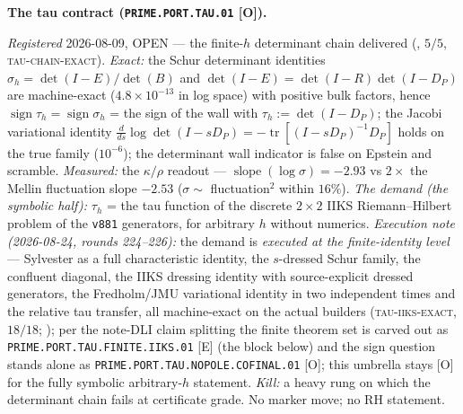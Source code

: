 \par\smallskip\noindent\textbf{The tau contract
(\texttt{PRIME.PORT.\allowbreak TAU.01} [O]).}
{\sloppy
\emph{Registered} 2026-08-09, OPEN --- the finite-$h$
determinant chain delivered
(, $5/5$,
\textsc{tau-chain-exact}).  \emph{Exact:} the Schur determinant
identities $\sigma_h = \det(I - E)/\det(B)$ and $\det(I - E) =
\det(I - R)\det(I - D_P)$ are machine-exact
($4.8\times10^{-13}$ in log space) with positive bulk factors,
hence $\operatorname{sign}\tau_h = \operatorname{sign}\sigma_h$
= the sign of the wall with $\tau_h := \det(I - D_P)$; the
Jacobi variational identity $\frac{d}{ds}\log\det(I - sD_P) =
-\operatorname{tr}[(I - sD_P)^{-1}D_P]$ holds on the true family
($10^{-6}$); the determinant wall indicator is false on Epstein
and scramble.  \emph{Measured:} the $\kappa/\rho$ readout ---
$\operatorname{slope}(\log\sigma) = -2.93$ vs $2\times$ the
Mellin fluctuation slope $-2.53$ ($\sigma \sim$ fluctuation$^2$
within $16\%$).  \emph{The demand (the symbolic half):} $\tau_h$
= the tau function of the discrete $2\times2$ IIKS
Riemann--Hilbert problem of the \texttt{v881} generators, for
arbitrary $h$ without numerics.  \emph{Execution note
(2026-08-24, rounds 224--226):} the demand is \emph{executed at
the finite-identity level} --- Sylvester as a full
characteristic identity, the $s$-dressed Schur family, the
confluent diagonal, the IIKS dressing identity with
source-explicit dressed generators, the Fredholm/JMU variational
identity in two independent times and the relative tau transfer,
all machine-exact on the actual builders
(\textsc{tau-iiks-exact}, $18/18$;
); per the note-DLI
claim splitting the finite theorem set is carved out as
\texttt{PRIME.PORT.TAU.FINITE.IIKS.01} [E] (the block below) and
the sign question stands alone as
\texttt{PRIME.PORT.TAU.NOPOLE.COFINAL.01} [O]; this umbrella
stays [O] for the fully symbolic arbitrary-$h$ statement.
\emph{Kill:} a heavy rung on
which the determinant chain fails at certificate grade.  No
marker move; no RH statement.\par}


